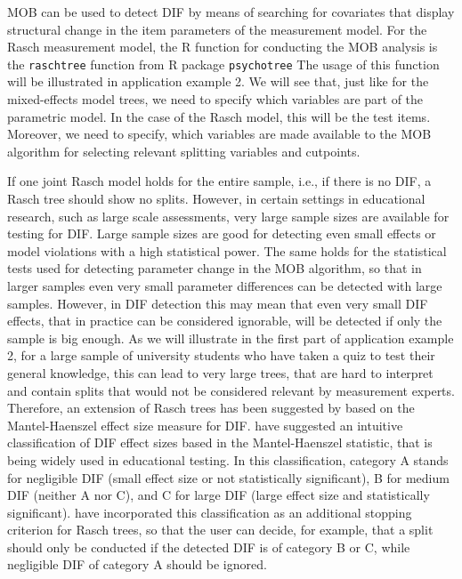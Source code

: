 \documentclass[doc,floatsintext,natbib]{apa7}
\begin{document}
MOB can be used to detect DIF by means of searching for covariates that display structural change in the item parameters of the measurement model. For the Rasch measurement model, the R function for conducting the MOB analysis is the \texttt{raschtree} function from R package \texttt{psychotree} \citep{StroyKopf15}  The usage of this function will be illustrated in application example 2. We will see that, just like for the mixed-effects model trees, we need to specify which variables are part of the parametric model. In the case of the Rasch model, this will be the test items. Moreover, we need to specify, which variables are made available to the MOB algorithm for selecting relevant splitting variables and cutpoints. 

If one joint Rasch model holds for the entire sample, i.e., if there is no DIF, a Rasch tree should show no splits. However, in certain settings in educational research, such as large scale assessments, very large sample sizes are available for testing for DIF. Large sample sizes are good for detecting even small effects or model violations with a high statistical power. The same holds for the statistical tests used for detecting parameter change in the MOB algorithm, so that in larger samples even very small parameter differences can be detected with large samples. However, in DIF detection this may mean that even very small DIF effects, that in practice can be considered ignorable, will be detected if only the sample is big enough. As we will illustrate in the first part of application example 2, for a large sample of university students who have taken a quiz to test their general knowledge, this can lead to very large trees, that are hard to interpret and contain splits that would not be considered relevant by measurement experts. Therefore, an extension of Rasch trees has been suggested by \citet{HenDebStr:2023:EPM} based on the Mantel-Haenszel effect size measure for DIF. \citet{HolTha:1985} have suggested an intuitive classification of DIF effect sizes based in the Mantel-Haenszel statistic, that is being widely used in educational testing. In this classification, category A stands for negligible DIF (small effect size or not statistically significant), B for medium DIF (neither A nor C), and C for large DIF (large effect size and statistically significant). \citet{HenDebStr:2023:EPM} have incorporated this classification as an additional stopping criterion for Rasch trees, so that the user can decide, for example, that a split should only be conducted if the detected DIF is of category B or C, while negligible DIF of category A should be ignored. 
\end{document}
